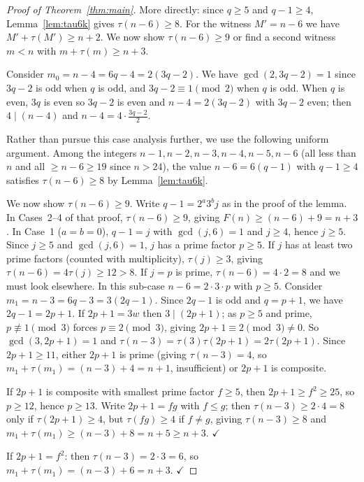 \documentclass[a4paper]{amsart}
\theoremstyle{definition}
\begin{document}
\begin{proof}[Proof of Theorem~\ref{thm:main}]
More directly: since $q \geq 5$ and $q - 1 \geq 4$, Lemma~\ref{lem:tau6k} gives
$\tau(n-6) \geq 8$.
For the witness $M' = n - 6$ we have $M' + \tau(M') \geq n + 2$.
We now show $\tau(n - 6) \geq 9$ or find a second witness $m < n$ with $m + \tau(m) \geq n + 3$.

Consider $m_0 = n - 4 = 6q - 4 = 2(3q - 2)$. We have $\gcd(2, 3q-2) = 1$ since $3q - 2$
is odd when $q$ is odd, and $3q - 2 \equiv 1 \pmod 2$ when $q$ is odd. When $q$ is even,
$3q$ is even so $3q - 2$ is even and $n - 4 = 2(3q-2)$ with $3q - 2$ even; then
$4 \mid (n-4)$ and $n - 4 = 4 \cdot \frac{3q-2}{2}$.

Rather than pursue this case analysis further, we use the following uniform argument.
Among the integers $n-1, n-2, n-3, n-4, n-5, n-6$ (all less than $n$ and all
$\geq n - 6 \geq 19$ since $n > 24$), the value $n - 6 = 6(q-1)$ with $q - 1 \geq 4$
satisfies $\tau(n-6) \geq 8$ by Lemma~\ref{lem:tau6k}.

We now show $\tau(n-6) \geq 9$. Write $q - 1 = 2^a 3^b j$ as in the proof of the lemma.
In Cases~2--4 of that proof, $\tau(n-6) \geq 9$, giving $F(n) \geq (n-6) + 9 = n + 3$.
In Case~1 ($a = b = 0$), $q - 1 = j$ with $\gcd(j,6)=1$ and $j \geq 4$, hence $j \geq 5$.
Since $j \geq 5$ and $\gcd(j,6)=1$, $j$ has a prime factor $p \geq 5$. If $j$ has
at least two prime factors (counted with multiplicity), $\tau(j) \geq 3$, giving
$\tau(n-6) = 4\tau(j) \geq 12 > 8$. If $j = p$ is prime, $\tau(n-6) = 4 \cdot 2 = 8$
and we must look elsewhere. In this sub-case $n - 6 = 2 \cdot 3 \cdot p$ with $p \geq 5$.
Consider $m_1 = n - 3 = 6q - 3 = 3(2q - 1)$. Since $2q - 1$ is odd and $q = p + 1$,
we have $2q - 1 = 2p + 1$. If $2p + 1 = 3w$ then $3 \mid (2p+1)$; as $p \geq 5$ and prime,
$p \not\equiv 1 \pmod 3$ forces $p \equiv 2 \pmod 3$, giving $2p + 1 \equiv 2 \pmod 3 \neq 0$.
So $\gcd(3, 2p+1) = 1$ and $\tau(n-3) = \tau(3)\tau(2p+1) = 2\tau(2p+1)$.
Since $2p + 1 \geq 11$, either $2p+1$ is prime (giving $\tau(n-3) = 4$,
so $m_1 + \tau(m_1) = (n-3)+4 = n+1$, insufficient) or $2p + 1$ is composite.

If $2p + 1$ is composite with smallest prime factor $f \geq 5$, then $2p + 1 \geq f^2 \geq 25$,
so $p \geq 12$, hence $p \geq 13$. Write $2p + 1 = fg$ with $f \leq g$; then
$\tau(n-3) \geq 2 \cdot 4 = 8$ only if $\tau(2p+1) \geq 4$, but $\tau(fg) \geq 4$ if
$f \neq g$, giving $\tau(n-3) \geq 8$ and $m_1 + \tau(m_1) \geq (n-3)+8 = n+5 \geq n+3$. $\checkmark$

If $2p + 1 = f^2$: then $\tau(n-3) = 2 \cdot 3 = 6$, so $m_1 + \tau(m_1) = (n-3)+6 = n+3$. $\checkmark$


\end{proof}
\end{document}
